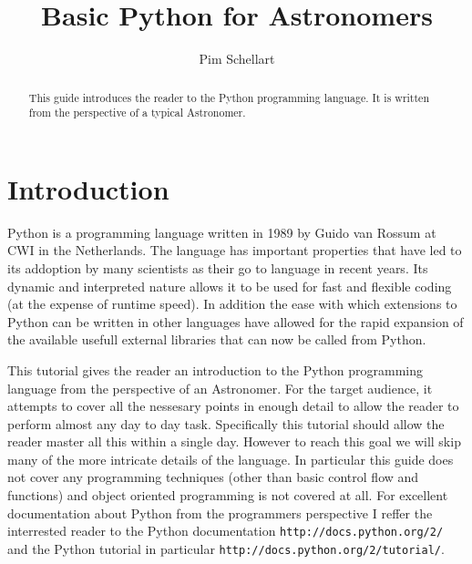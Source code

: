 \documentclass[10pt,a4paper]{article}
\title{Basic Python for Astronomers}
\author{Pim Schellart}
\begin{document}
\maketitle
\begin{abstract}
This guide introduces the reader to the Python programming language. It is written from the perspective of a typical Astronomer.
\end{abstract}
\tableofcontents
\section{Introduction}
Python is a programming language written in 1989 by Guido van Rossum at CWI in the Netherlands. The language has important properties that have led to its addoption by many scientists as their go to language in recent years. Its dynamic and interpreted nature allows it to be used for fast and flexible coding (at the expense of runtime speed). In addition the ease with which extensions to Python can be written in other languages have allowed for the rapid expansion of the available usefull external libraries that can now be called from Python.

This tutorial gives the reader an introduction to the Python programming language from the perspective of an Astronomer. For the target audience, it attempts to cover all the nessesary points in enough detail to allow the reader to perform almost any day to day task. Specifically this tutorial should allow the reader master all this within a single day. However to reach this goal we will skip many of the more intricate details of the language. In particular this guide does not cover any programming techniques (other than basic control flow and functions) and object oriented programming is not covered at all. For excellent documentation about Python from the programmers perspective I reffer the interrested reader to the Python documentation \verb|http://docs.python.org/2/| and the Python tutorial in particular \verb|http://docs.python.org/2/tutorial/|.
\end{document}
